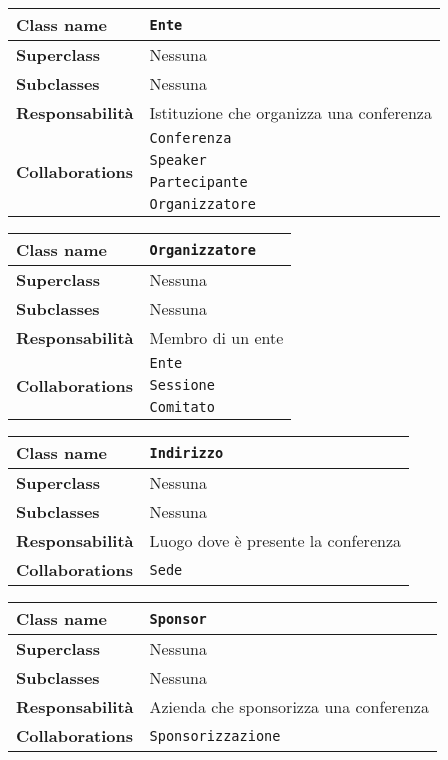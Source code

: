 \begin{table}[h!]
\begin{tabular}{|l|l|}
		\hline
		\textbf{Class name} & \texttt{Ente} \\ \hline
		\textbf{Superclass} & Nessuna \\ \hline
		\textbf{Subclasses} & Nessuna  \\ \hline
		\textbf{Responsabilità} & Istituzione che organizza una conferenza \\ \hline
		\multirow{4}{*}{\textbf{Collaborations}} & \texttt{Conferenza} \\ 
		& \texttt{Speaker} \\
		& \texttt{Partecipante} \\
		& \texttt{Organizzatore} \\ \hline
\end{tabular}
\end{table}

\begin{table}[h!]
	\begin{tabular}{|l|l|}
	\hline
	\textbf{Class name} & \texttt{Organizzatore} \\ \hline
	\textbf{Superclass} & Nessuna \\ \hline
	\textbf{Subclasses} & Nessuna  \\ \hline
	\textbf{Responsabilità} & Membro di un ente \\ \hline
	\multirow{3}{*}{\textbf{Collaborations}} & \texttt{Ente} \\ 
	& \texttt{Sessione} \\ 
	&\texttt{Comitato} \\ \hline
\end{tabular}
\quad
\begin{tabular}{|l|l|}
		\hline
		\textbf{Class name} & \texttt{Indirizzo} \\ \hline
		\textbf{Superclass} & Nessuna \\ \hline
		\textbf{Subclasses} & Nessuna  \\ \hline
		\textbf{Responsabilità} & Luogo dove è presente la conferenza \\ \hline
		\multirow{1}{*}{\textbf{Collaborations}} & \texttt{Sede }\\ \hline
	\end{tabular}
\end{table}

\begin{table}[h!]
\begin{tabular}{|l|l|}
	\hline
	\textbf{Class name} & \texttt{Sponsor }\\ \hline
	\textbf{Superclass} & Nessuna \\ \hline
	\textbf{Subclasses} & Nessuna  \\ \hline
	\textbf{Responsabilità} & Azienda che sponsorizza una conferenza \\ \hline
	\multirow{1}{*}{\textbf{Collaborations}} & \texttt{Sponsorizzazione} \\ \hline
\end{tabular}
\end{table}

